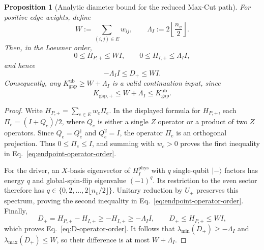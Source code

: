 \documentclass[11pt, a4paper]{article}
\newtheorem{proposition}[theorem]{Proposition}
\newcommand{\ket}[1]{| #1 \rangle}
\begin{document}
\begin{proposition}[Analytic diameter bound for the reduced Max-Cut path]
\label{prop:computational-diameter-bound}
For positive edge weights, define
\begin{equation}
W:=\sum_{(i,j)\in E}w_{ij},
\qquad
\Lambda_I:=2\left\lfloor\frac{n_v}{2}\right\rfloor.
\end{equation}
Then, in the Loewner order,
\begin{equation}
\label{eq:endpoint-operator-order}
0\le H_{P,+}\le WI,
\qquad
0\le H_{I,+}\le\Lambda_I I,
\end{equation}
and hence
\begin{equation}
\label{eq:D-operator-order}
-\Lambda_I I\le D_+\le WI.
\end{equation}
Consequently, any $K_{\mathrm{gap}}^{\mathrm{ub}}\ge W+\Lambda_I$ is a valid continuation input, since
\begin{equation}
\label{eq:computational-gap-bounds}
K_{\mathrm{gap},+}\le W+\Lambda_I\le K_{\mathrm{gap}}^{\mathrm{ub}}.
\end{equation}
\end{proposition}

\begin{proof}
Write $H_{P,+}=\sum_{e\in E}w_e\Pi_e$. In the displayed formula for $H_{P,+}$, each $\Pi_e=(I+Q_e)/2$, where $Q_e$ is either a single $Z$ operator or a product of two $Z$ operators. Since $Q_e=Q_e^\dagger$ and $Q_e^2=I$, the operator $\Pi_e$ is an orthogonal projection. Thus $0\le\Pi_e\le I$, and summing with $w_e>0$ proves the first inequality in Eq.~\eqref{eq:endpoint-operator-order}.

For the driver, an $X$-basis eigenvector of $H_I^{\mathrm{phys}}$ with $q$ single-qubit $\ket{-}$ factors has energy $q$ and global-spin-flip eigenvalue $(-1)^q$. Its restriction to the even sector therefore has $q\in\{0,2,\ldots,2\lfloor n_v/2\rfloor\}$. Unitary reduction by $U_+$ preserves this spectrum, proving the second inequality in Eq.~\eqref{eq:endpoint-operator-order}. Finally,
\begin{equation}
D_+=H_{P,+}-H_{I,+}\ge-H_{I,+}\ge-\Lambda_I I,
\qquad
D_+\le H_{P,+}\le WI,
\end{equation}
which proves Eq.~\eqref{eq:D-operator-order}. It follows that $\lambda_{\min}(D_+)\ge-\Lambda_I$ and $\lambda_{\max}(D_+)\le W$, so their difference is at most $W+\Lambda_I$.
\end{proof}
\end{document}
